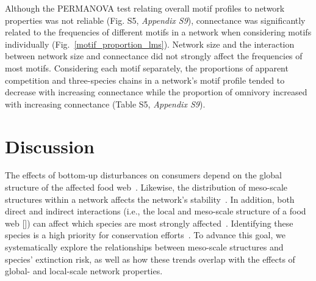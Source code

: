 \documentclass[12pt]{article}
\begin{document}
\begin{spacing}{2.0}
        Although the PERMANOVA test relating overall motif profiles to network properties was not reliable (Fig. S5, \emph{Appendix S9}), 
        connectance was significantly related to the frequencies of different motifs in a network when considering motifs individually (Fig.~\ref{motif_proportion_lms}).
        Network size and the interaction between network size and connectance did not strongly affect the frequencies of most motifs.
        Considering each motif separately, the proportions of apparent competition and three-species chains in a network's motif profile tended to decrease with increasing connectance while the proportion of omnivory increased with increasing connectance (Table S5, \emph{Appendix S9}). 
    









\section*{Discussion}

    The effects of bottom-up disturbances on consumers depend on the global structure of the affected food web~\citep{Dunne2002, Eklof2006, PascualDunne2006}.
    Likewise, the distribution of meso-scale structures within a network affects the network's stability~\citep{prill2005dynamic, bascompte2005simple}.
    In addition, both direct and indirect interactions (i.e., the local and meso-scale structure of a food web  [\citealp[]{Cirtwill2018FoodWebs}]) can affect which species are most strongly affected~\citep{curtsdotter2011robustness, dunne2009cascading, Eklof2006}. 
    Identifying these species is a high priority for conservation efforts~\citep{Bottrilletal2008}.
    To advance this goal, we systematically explore the relationships between meso-scale structures and species' extinction risk, as well as how these trends overlap with the effects of global- and local-scale network properties.


\end{spacing}
\end{document}
